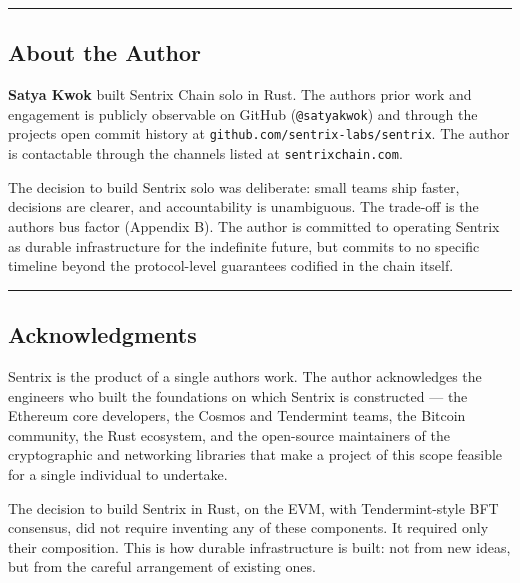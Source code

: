 \documentclass[11pt,a4paper]{article}
\begin{document}
\begin{center}\rule{0.5\linewidth}{0.5pt}\end{center}

\hypertarget{about-the-author}{%
\subsection{About the Author}\label{about-the-author}}

\textbf{Satya Kwok} built Sentrix Chain solo in Rust. The
author\textquotesingle s prior work and engagement is publicly
observable on GitHub (\texttt{@satyakwok}) and through the
project\textquotesingle s open commit history at
\texttt{github.com/sentrix-labs/sentrix}. The author is contactable
through the channels listed at \texttt{sentrixchain.com}.

The decision to build Sentrix solo was deliberate: small teams ship
faster, decisions are clearer, and accountability is unambiguous. The
trade-off is the author\textquotesingle s bus factor (Appendix B). The
author is committed to operating Sentrix as durable infrastructure for
the indefinite future, but commits to no specific timeline beyond the
protocol-level guarantees codified in the chain itself.

\begin{center}\rule{0.5\linewidth}{0.5pt}\end{center}

\hypertarget{acknowledgments}{%
\subsection{Acknowledgments}\label{acknowledgments}}

Sentrix is the product of a single author\textquotesingle s work. The
author acknowledges the engineers who built the foundations on which
Sentrix is constructed --- the Ethereum core developers, the Cosmos and
Tendermint teams, the Bitcoin community, the Rust ecosystem, and the
open-source maintainers of the cryptographic and networking libraries
that make a project of this scope feasible for a single individual to
undertake.

The decision to build Sentrix in Rust, on the EVM, with Tendermint-style
BFT consensus, did not require inventing any of these components. It
required only their composition. This is how durable infrastructure is
built: not from new ideas, but from the careful arrangement of existing
ones.
\end{document}

